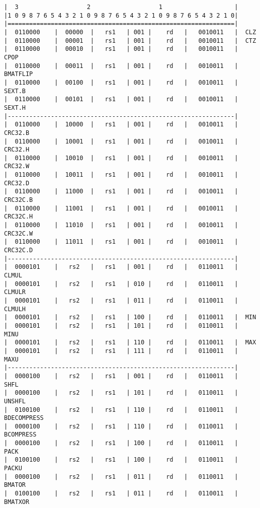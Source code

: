 \begin{minipage}{\linewidth}
\begin{verbatim}
|  3                   2                   1                    |
|1 0 9 8 7 6 5 4 3 2 1 0 9 8 7 6 5 4 3 2 1 0 9 8 7 6 5 4 3 2 1 0|
|===============================================================|
|  0110000    |  00000  |   rs1   | 001 |    rd   |   0010011   |  CLZ
|  0110000    |  00001  |   rs1   | 001 |    rd   |   0010011   |  CTZ
|  0110000    |  00010  |   rs1   | 001 |    rd   |   0010011   |  CPOP
|  0110000    |  00011  |   rs1   | 001 |    rd   |   0010011   |  BMATFLIP
|  0110000    |  00100  |   rs1   | 001 |    rd   |   0010011   |  SEXT.B
|  0110000    |  00101  |   rs1   | 001 |    rd   |   0010011   |  SEXT.H
|---------------------------------------------------------------|
|  0110000    |  10000  |   rs1   | 001 |    rd   |   0010011   |  CRC32.B
|  0110000    |  10001  |   rs1   | 001 |    rd   |   0010011   |  CRC32.H
|  0110000    |  10010  |   rs1   | 001 |    rd   |   0010011   |  CRC32.W
|  0110000    |  10011  |   rs1   | 001 |    rd   |   0010011   |  CRC32.D
|  0110000    |  11000  |   rs1   | 001 |    rd   |   0010011   |  CRC32C.B
|  0110000    |  11001  |   rs1   | 001 |    rd   |   0010011   |  CRC32C.H
|  0110000    |  11010  |   rs1   | 001 |    rd   |   0010011   |  CRC32C.W
|  0110000    |  11011  |   rs1   | 001 |    rd   |   0010011   |  CRC32C.D
|---------------------------------------------------------------|
|  0000101    |   rs2   |   rs1   | 001 |    rd   |   0110011   |  CLMUL
|  0000101    |   rs2   |   rs1   | 010 |    rd   |   0110011   |  CLMULR
|  0000101    |   rs2   |   rs1   | 011 |    rd   |   0110011   |  CLMULH
|  0000101    |   rs2   |   rs1   | 100 |    rd   |   0110011   |  MIN
|  0000101    |   rs2   |   rs1   | 101 |    rd   |   0110011   |  MINU
|  0000101    |   rs2   |   rs1   | 110 |    rd   |   0110011   |  MAX
|  0000101    |   rs2   |   rs1   | 111 |    rd   |   0110011   |  MAXU
|---------------------------------------------------------------|
|  0000100    |   rs2   |   rs1   | 001 |    rd   |   0110011   |  SHFL
|  0000100    |   rs2   |   rs1   | 101 |    rd   |   0110011   |  UNSHFL
|  0100100    |   rs2   |   rs1   | 110 |    rd   |   0110011   |  BDECOMPRESS
|  0000100    |   rs2   |   rs1   | 110 |    rd   |   0110011   |  BCOMPRESS
|  0000100    |   rs2   |   rs1   | 100 |    rd   |   0110011   |  PACK
|  0100100    |   rs2   |   rs1   | 100 |    rd   |   0110011   |  PACKU
|  0000100    |   rs2   |   rs1   | 011 |    rd   |   0110011   |  BMATOR
|  0100100    |   rs2   |   rs1   | 011 |    rd   |   0110011   |  BMATXOR

\end{verbatim}
\end{minipage}
